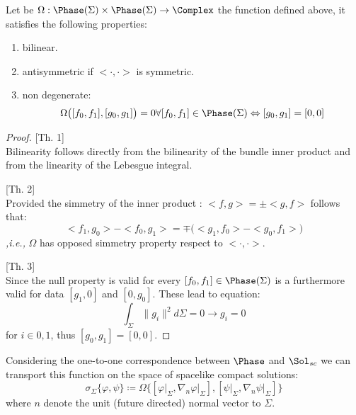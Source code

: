\documentclass[Main]{subfiles}
\begin{document}
			\begin{proposition}
				Let be $\Omega: \Phase(\Sigma) \times \Phase(\Sigma) \rightarrow \Complex $ the function defined above, it satisfies the following properties:
				\begin{enumerate}
					\item bilinear.
					\item antisymmetric if $<\cdot, \cdot>$ is symmetric.
					\item non degenerate:
						\begin{displaymath}
							\Omega\big( [f_0,f_1], [g_0,g_1] \big) =0 \forall [f_0,f_1]\in \Phase(\Sigma) \Leftrightarrow [g_0,g_1] =[0,0]
						\end{displaymath}
				\end{enumerate}								
			\end{proposition}
			\begin{proof}

			[Th. 1]\\
			Bilinearity follows directly from the bilinearity of the bundle inner product and from the linearity of the Lebesgue integral.

			[Th. 2]\\
			Provided the simmetry of the inner product : $ <f,g> = \pm <g,f>$ follows that:
				\begin{displaymath}
					<f_1,g_0> -<f_0,g_1> = \mp \big( <g_1,f_0> - <g_0,f_1> \big)
				\end{displaymath}
			\textit{,i.e.,} $\Omega$ has opposed simmetry property respect to $<\cdot,\cdot>$.

			[Th. 3]\\
			Since the null property is valid for every $[f_0,f_1]\in \Phase(\Sigma)$ is a furthermore valid for data $[g_1,0]$ and $[0,g_0]$.
			These lead to equation:
			\begin{displaymath}
				\int_\Sigma \parallel g_i \parallel^2 d\Sigma = 0 \rightarrow g_i = 0 
			\end{displaymath}
			for $i \in {0,1}$, thus $[g_0,g_1] = [0,0]$.
			\end{proof}

			Considering the one-to-one correspondence between $\Phase$ and $\Sol_{sc}$ we can transport this function on the space of spacelike compact solutions:
			\begin{displaymath}
				\sigma_\Sigma \big\{ \varphi, \psi \big\} \coloneqq 
				\Omega \big\{ [\varphi\vert_\Sigma, \nabla_n\varphi\vert_\Sigma] ,[\psi\vert_\Sigma,\nabla_n\psi\vert_\Sigma] \big\}
			\end{displaymath}				
			where $n$ denote the unit (future directed) normal vector to $\Sigma$.
				
\end{document}
